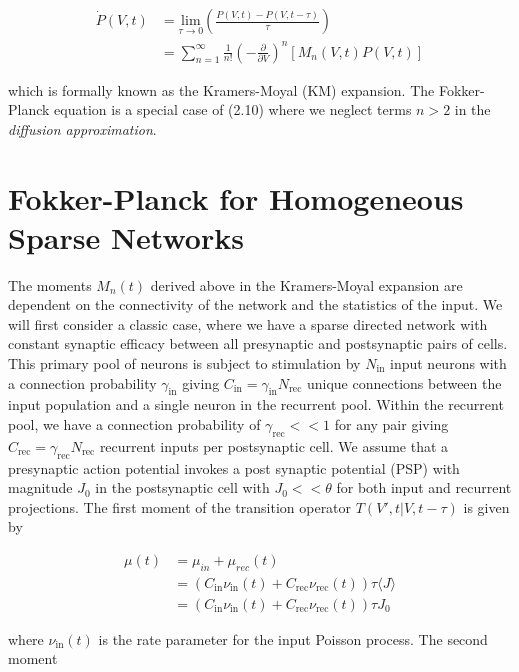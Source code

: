 \documentclass{ucetd}
\begin{document}
\begin{align}
\dot{P}(V,t)  &= \underset{\tau\rightarrow 0}{\mathrm{lim}}\left(\frac{P(V, t)-P(V, t-\tau)}{\tau}\right)\\
&= \sum_{n=1}^{\infty} \frac{1}{n!}\left(-\frac{\partial}{\partial V}\right)^{n} \left[M_{n}(V,t)P(V,t)\right]
\end{align} 

which is formally known as the Kramers-Moyal (KM) expansion. The Fokker-Planck equation is a special case of (2.10) where we neglect terms $n>2$ in the \emph{diffusion approximation}.

\section{Fokker-Planck for Homogeneous Sparse Networks}

The moments $M_{n}(t)$ derived above in the Kramers-Moyal expansion are dependent on the connectivity of the network and the statistics of the input. We will first consider a classic case, where we have a sparse directed network with constant synaptic efficacy between all presynaptic and postsynaptic pairs of cells. This primary pool of neurons is subject to stimulation by $N_{\mathrm{in}}$ input neurons with a connection probability $\gamma_{\mathrm{in}}$ giving $C_{\mathrm{in}} = \gamma_{\mathrm{in}}N_{\mathrm{rec}}$ unique connections between the input population and a single neuron in the recurrent pool. Within the recurrent pool, we have a connection probability of $\gamma_{\mathrm{rec}} << 1$ for any pair giving $C_{\mathrm{rec}} = \gamma_{\mathrm{rec}} N_{\mathrm{rec}}$ recurrent inputs per postsynaptic cell. We assume that a presynaptic action potential invokes a post synaptic potential (PSP) with magnitude $J_{0}$ in the postsynaptic cell with $J_{0} << \theta$ for both input and recurrent projections. The first moment of the transition operator $T(V',t| V,t-\tau)$ is given by

\begin{align*}
\mu(t) &= \mu_{in} + \mu_{rec}(t)\\
&= \left(C_{\mathrm{in}}\nu_{\mathrm{in}}(t) + C_{\mathrm{rec}}\nu_{\mathrm{rec}}(t)\right)\tau\langle J\rangle\\
&= \left(C_{\mathrm{in}}\nu_{\mathrm{in}}(t) + C_{\mathrm{rec}}\nu_{\mathrm{rec}}(t)\right)\tau J_{0}
\end{align*}

where $\nu_{\mathrm{in}}(t)$ is the rate parameter for the input Poisson process. The second moment
\end{document}
